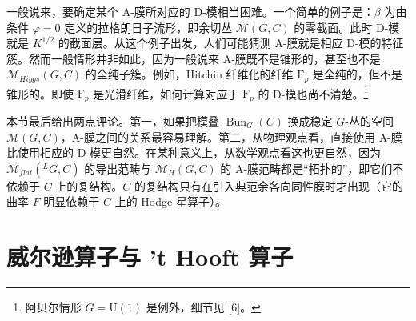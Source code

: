 \documentclass[11pt,a4paper,UTF8]{ctexart}
\begin{document}
一般说来，要确定某个 A-膜所对应的 D-模相当困难。一个简单的例子是：$\beta$ 为由条件 $\varphi=0$ 定义的拉格朗日子流形，即余切丛 $\mathcal{M}(G,C)$ 的零截面。此时 D-模就是 $K^{1/2}$ 的截面层。从这个例子出发，人们可能猜测 A-膜就是相应 D-模的特征簇。然而一般情形并非如此，因为一般说来 A-膜既不是锥形的，甚至也不是 $\mathcal{M}_{Higgs}(G,C)$ 的全纯子簇。例如，Hitchin 纤维化的纤维 $\mathrm{F}_{p}$ 是全纯的，但不是锥形的。即使 $\mathrm{F}_{p}$ 是光滑纤维，如何计算对应于 $\mathrm{F}_{p}$ 的 D-模也尚不清楚。\footnote{阿贝尔情形 $G=\mathrm{U}(1)$ 是例外，细节见 [6]。}



本节最后给出两点评论。第一，如果把模叠 $\operatorname{Bun}_{G}(C)$ 换成稳定 $G$-丛的空间 $\mathcal{M}(G,C)$，A-膜之间的关系最容易理解。第二，从物理观点看，直接使用 A-膜比使用相应的 D-模更自然。在某种意义上，从数学观点看这也更自然，因为 $\mathcal{M}_{flat}({}^{L}G,C)$ 的导出范畴与 $\mathcal{M}_{H}(G,C)$ 的 A-膜范畴都是“拓扑的”，即它们不依赖于 $C$ 上的复结构。$C$ 的复结构只有在引入典范余各向同性膜时才出现（它的曲率 $F$ 明显依赖于 $C$ 上的 Hodge 星算子）。



\section{威尔逊算子与 't Hooft 算子}
\end{document}
